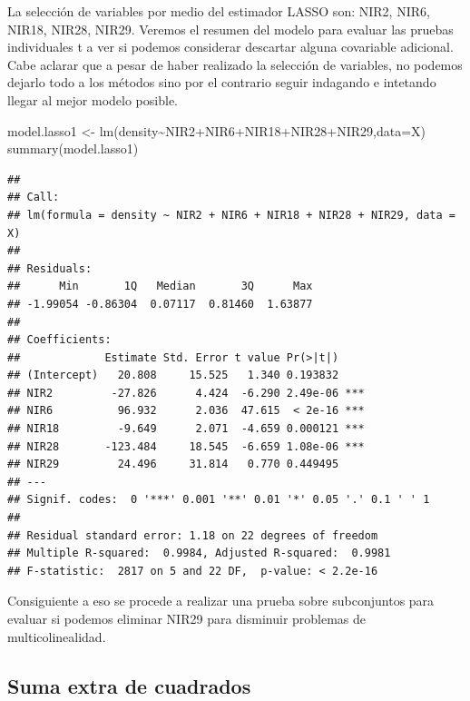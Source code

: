 \documentclass[
]{article}
\newenvironment{Shaded}{\begin{snugshade}}{\end{snugshade}}
\newcommand{\AttributeTok}[1]{\textcolor[rgb]{0.77,0.63,0.00}{#1}}
\newcommand{\FunctionTok}[1]{\textcolor[rgb]{0.00,0.00,0.00}{#1}}
\newcommand{\NormalTok}[1]{#1}
\newcommand{\OtherTok}[1]{\textcolor[rgb]{0.56,0.35,0.01}{#1}}
\newcommand{\SpecialCharTok}[1]{\textcolor[rgb]{0.00,0.00,0.00}{#1}}
\begin{document}
La selección de variables por medio del estimador LASSO son: NIR2, NIR6,
NIR18, NIR28, NIR29. Veremos el resumen del modelo para evaluar las
pruebas individuales t a ver si podemos considerar descartar alguna
covariable adicional. Cabe aclarar que a pesar de haber realizado la
selección de variables, no podemos dejarlo todo a los métodos sino por
el contrario seguir indagando e intetando llegar al mejor modelo
posible.

\begin{Shaded}
\begin{Highlighting}[]
\NormalTok{model.lasso1 }\OtherTok{\textless{}{-}} \FunctionTok{lm}\NormalTok{(density}\SpecialCharTok{\textasciitilde{}}\NormalTok{NIR2}\SpecialCharTok{+}\NormalTok{NIR6}\SpecialCharTok{+}\NormalTok{NIR18}\SpecialCharTok{+}\NormalTok{NIR28}\SpecialCharTok{+}\NormalTok{NIR29,}\AttributeTok{data=}\NormalTok{X)}
\FunctionTok{summary}\NormalTok{(model.lasso1)}
\end{Highlighting}
\end{Shaded}

\begin{verbatim}
## 
## Call:
## lm(formula = density ~ NIR2 + NIR6 + NIR18 + NIR28 + NIR29, data = X)
## 
## Residuals:
##      Min       1Q   Median       3Q      Max 
## -1.99054 -0.86304  0.07117  0.81460  1.63877 
## 
## Coefficients:
##             Estimate Std. Error t value Pr(>|t|)    
## (Intercept)   20.808     15.525   1.340 0.193832    
## NIR2         -27.826      4.424  -6.290 2.49e-06 ***
## NIR6          96.932      2.036  47.615  < 2e-16 ***
## NIR18         -9.649      2.071  -4.659 0.000121 ***
## NIR28       -123.484     18.545  -6.659 1.08e-06 ***
## NIR29         24.496     31.814   0.770 0.449495    
## ---
## Signif. codes:  0 '***' 0.001 '**' 0.01 '*' 0.05 '.' 0.1 ' ' 1
## 
## Residual standard error: 1.18 on 22 degrees of freedom
## Multiple R-squared:  0.9984, Adjusted R-squared:  0.9981 
## F-statistic:  2817 on 5 and 22 DF,  p-value: < 2.2e-16
\end{verbatim}

Consiguiente a eso se procede a realizar una prueba sobre subconjuntos
para evaluar si podemos eliminar NIR29 para disminuir problemas de
multicolinealidad.

\hypertarget{suma-extra-de-cuadrados}{%
\subsection{Suma extra de cuadrados}\label{suma-extra-de-cuadrados}}
\end{document}

